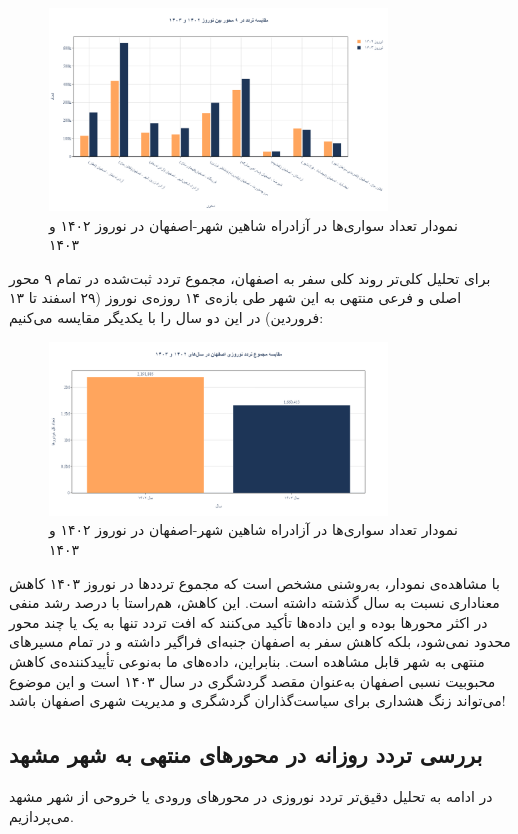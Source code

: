 \documentclass[a4paper, 12pt]{article}
\begin{document}
\begin{figure}[htbp]
    \centering
    \includegraphics[width=0.8\textwidth]{pics/isfahan/isfahan_all_roads.png}
    \caption{نمودار تعداد سواری‌ها در آزادراه شاهین شهر-اصفهان در نوروز ۱۴۰۲ و ۱۴۰۳}
\end{figure}

\newpage
برای تحلیل کلی‌تر روند کلی سفر به اصفهان، مجموع تردد ثبت‌شده در تمام ۹ محور اصلی و فرعی منتهی به این شهر طی بازه‌ی ۱۴ روزه‌ی نوروز (۲۹ اسفند تا ۱۳ فروردین) در این دو سال را با یکدیگر مقایسه می‌کنیم:
\begin{figure}[htbp]
    \centering
    \includegraphics[width=0.8\textwidth]{pics/isfahan/all_isf.png}
    \caption{نمودار تعداد سواری‌ها در آزادراه شاهین شهر-اصفهان در نوروز ۱۴۰۲ و ۱۴۰۳}
\end{figure}
با مشاهده‌ی نمودار، به‌روشنی مشخص است که مجموع ترددها در نوروز ۱۴۰۳ کاهش معناداری نسبت به سال گذشته داشته است. این کاهش، هم‌راستا با درصد رشد منفی در اکثر محورها بوده و این داده‌ها تأکید می‌کنند که افت تردد تنها به یک یا چند محور محدود نمی‌شود، بلکه کاهش سفر به اصفهان جنبه‌ای فراگیر داشته و در تمام مسیرهای منتهی به شهر قابل مشاهده است. بنابراین، داده‌های ما به‌نوعی تأییدکننده‌ی کاهش محبوبیت نسبی اصفهان به‌عنوان مقصد گردشگری در سال ۱۴۰۳ است و این موضوع می‌تواند زنگ هشداری برای سیاست‌گذاران گردشگری و مدیریت شهری اصفهان باشد!


\newpage
\subsection{بررسی تردد روزانه در محورهای منتهی به شهر مشهد}
در ادامه به تحلیل دقیق‌تر تردد نوروزی در محورهای ورودی یا خروحی از شهر مشهد می‌پردازیم.
\\
\end{document}
